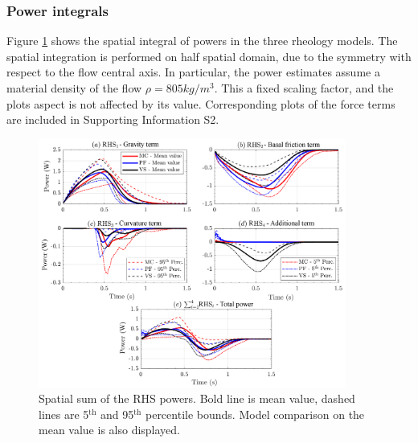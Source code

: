 \documentclass{article}
\begin{document}
\subsubsection{Power integrals}
Figure \ref{fig:Ramp-Power-spatial} shows the spatial integral of powers in the three rheology models. The spatial integration is performed on half spatial domain, due to the symmetry with respect to the flow central axis. In particular, the power estimates assume a material density of the flow $\rho = 805 kg/m^3$. This a fixed scaling factor, and the plots aspect is not affected by its value. Corresponding plots of the force terms are included in Supporting Information S2. \begin{figure}[H]
        \centering
        \includegraphics[width=0.9\textwidth]{InclinedPlane/AveragedMeasurments/PowersIncline.png}
        \caption{Spatial sum of the RHS powers. Bold line is mean value, dashed lines are 5$^{\mathrm{th}}$ and 95$^{\mathrm{th}}$ percentile bounds. Model comparison on the mean value is also displayed.}
        \label{fig:Ramp-Power-spatial}
\end{figure}
\end{document}
